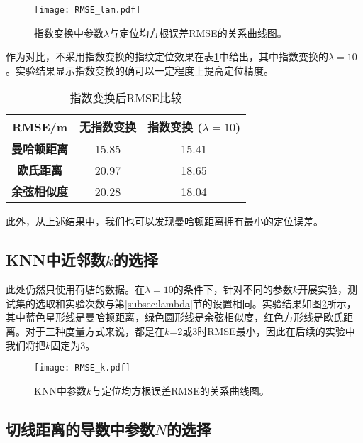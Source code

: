 \begin{figure}[htb]
	\centering
	\texttt{[image: RMSE\_lam.pdf]}
	\caption{指数变换中参数$\lambda$与定位均方根误差RMSE的关系曲线图。}
	\label{fig:rmse_lam}
\end{figure}

作为对比，不采用指数变换的指纹定位效果在表\ref{tab:no_exp}中给出，其中指数变换的$\lambda=10$。实验结果显示指数变换的确可以一定程度上提高定位精度。

\begin{table}[htb]
	\caption{指数变换后RMSE比较}
	\begin{center}
		\begin{tabular}{ccc}
			\toprule
			\textbf{RMSE/m} & \textbf{无指数变换} & \textbf{指数变换 ($\lambda=10$)} \\
			\midrule
			\textbf{曼哈顿距离} & 15.85 & 15.41 \\
			\midrule
			\textbf{欧氏距离} & 20.97 & 18.65 \\
			\midrule
			\textbf{余弦相似度} & 20.28 & 18.04 \\
			\bottomrule
		\end{tabular}
		\label{tab:no_exp}
	\end{center}
\end{table}

此外，从上述结果中，我们也可以发现曼哈顿距离拥有最小的定位误差。

\subsection{KNN中近邻数$k$的选择}

此处仍然只使用荷塘的数据。在$\lambda=10$的条件下，针对不同的参数$k$开展实验，测试集的选取和实验次数与第\ref{subsec:lambda}节的设置相同。实验结果如图\ref{fig:rmse_k}所示，其中蓝色星形线是曼哈顿距离，绿色圆形线是余弦相似度，红色方形线是欧氏距离。对于三种度量方式来说，都是在$k$=2或3时RMSE最小，因此在后续的实验中我们将把$k$固定为3。

\begin{figure}[htb]
	\centering
	\texttt{[image: RMSE\_k.pdf]}
	\caption{KNN中参数$k$与定位均方根误差RMSE的关系曲线图。}
	\label{fig:rmse_k}
\end{figure}

\subsection{切线距离的导数中参数$N$的选择}

